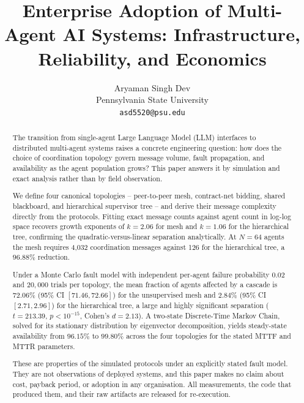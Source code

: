 \documentclass[10pt,twocolumn,letterpaper]{article}
\begin{document}
\title{Enterprise Adoption of Multi-Agent AI Systems: Infrastructure, Reliability, and Economics}

\author{
Aryaman Singh Dev\\
Pennsylvania State University \\
\texttt{asd5520@psu.edu}
}

\maketitle

\begin{abstract}
The transition from single-agent Large Language Model (LLM) interfaces to distributed multi-agent systems raises a concrete engineering question: how does the choice of coordination topology govern message volume, fault propagation, and availability as the agent population grows? This paper answers it by simulation and exact analysis rather than by field observation.

We define four canonical topologies -- peer-to-peer mesh, contract-net bidding, shared blackboard, and hierarchical supervisor tree -- and derive their message complexity directly from the protocols. Fitting exact message counts against agent count in log-log space recovers growth exponents of $k = 2.06$ for mesh and $k = 1.06$ for the hierarchical tree, confirming the quadratic-versus-linear separation analytically. At $N = 64$ agents the mesh requires 4{,}032 coordination messages against 126 for the hierarchical tree, a $96.88\%$ reduction.

Under a Monte Carlo fault model with independent per-agent failure probability $0.02$ and $20{,}000$ trials per topology, the mean fraction of agents affected by a cascade is $72.06\%$ (95\% CI $[71.46, 72.66]$) for the unsupervised mesh and $2.84\%$ (95\% CI $[2.71, 2.96]$) for the hierarchical tree, a large and highly significant separation ($t = 213.39$, $p < 10^{-15}$, Cohen's $d = 2.13$). A two-state Discrete-Time Markov Chain, solved for its stationary distribution by eigenvector decomposition, yields steady-state availability from $96.15\%$ to $99.80\%$ across the four topologies for the stated MTTF and MTTR parameters.

These are properties of the simulated protocols under an explicitly stated fault model. They are not observations of deployed systems, and this paper makes no claim about cost, payback period, or adoption in any organisation. All measurements, the code that produced them, and their raw artifacts are released for re-execution.
\end{abstract}
\end{document}
